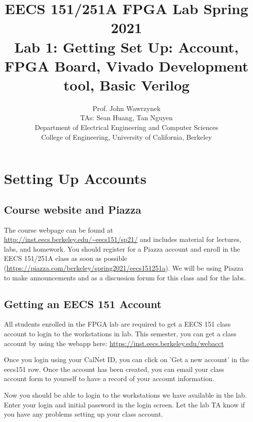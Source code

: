 \documentclass[11pt]{article}
\begin{document}
\title{EECS 151/251A FPGA Lab Spring 2021\\
Lab 1: Getting Set Up: Account, FPGA Board, Vivado Development tool, Basic Verilog}

\author{Prof. John Wawrzynek \\
TAs: Sean Huang, Tan Nguyen \\ Department of Electrical Engineering and Computer Sciences\\
College of Engineering, University of California, Berkeley}

\date{}
\maketitle

\section{Setting Up Accounts}

\subsection{Course website and Piazza}
The course webpage can be found at \url{http://inst.eecs.berkeley.edu/~eecs151/sp21/} and includes material for lectures, labs, and homework.  You should register for a Piazza account and enroll in the EECS 151/251A class as soon as possible (\url{https://piazza.com/berkeley/spring2021/eecs151251a}). We will be using Piazza to make announcements and as a discussion forum for this class and for the labs.

\subsection{Getting an EECS 151 Account}
All students enrolled in the FPGA lab are required to get a EECS 151 class account to login to the workstations in lab. This semester, you can get a class account by using the webapp here:
\url{https://inst.eecs.berkeley.edu/webacct}

Once you login using your CalNet ID, you can click on 'Get a new account' in the eecs151 row. Once the account has been created, you can email your class account form to yourself to have a record of your account information.

Now you should be able to login to the workstations we have available in the lab. Enter your login and initial password in the login screen. Let the lab TA know if you have any problems setting up your class account.
\end{document}
